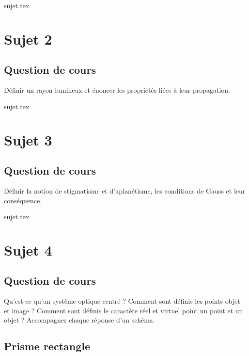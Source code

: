 \documentclass[a4paper, 11pt, oneside]{book}
\begin{document}
\resetQ
{sujet.tex}

\resetQ
\newpage

\chapter{Sujet 2}
\section{Question de cours}

Définir un rayon lumineux et énoncer les propriétés liées à leur propagation.

{sujet.tex}

\resetQ
\newpage

\chapter{Sujet 3}
\section{Question de cours}

Définir la notion de stigmatisme et d'aplanétisme, les conditions de Gauss et
leur conséquence.

{sujet.tex}

\resetQ
\newpage

\chapter{Sujet 4}
\section{Question de cours}

Qu'est-ce qu'un système optique centré ? Comment sont définis les points objet
et image ? Comment sont définis le caractère réel et virtuel point un point et
un objet ? Accompagner chaque réponse d'un schéma.

\section{Prisme rectangle}
\end{document}
